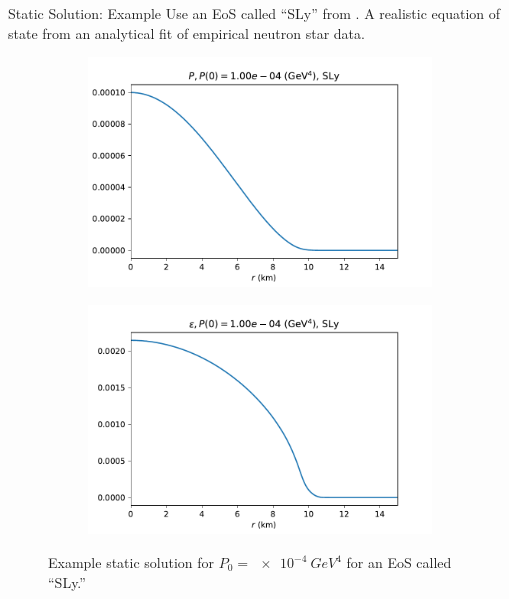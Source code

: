 \documentclass[handout]{beamer}
\begin{document}
    \begin{frame}{Static Solution: Example}
        \pause
        Use an EoS called ``SLy'' from \autocite{SLy_2004}. A realistic equation of state from an analytical fit of empirical neutron star data. \pause

        \begin{figure}[h!]
            \centering
            \begin{subfigure}{.5\textwidth}
                \includegraphics[width = \textwidth]{SLy_P,p0_0.0001.pdf}
            \end{subfigure}%
            \begin{subfigure}{.5\textwidth}
                \includegraphics[width = \textwidth]{SLy_rho,p0_0.0001.pdf}
            \end{subfigure}
            \caption[]{Example static solution for $P_0 = \SI{e-4}{GeV^4}$ for an EoS called ``SLy.''}
        \end{figure}

    \end{frame}
\end{document}
